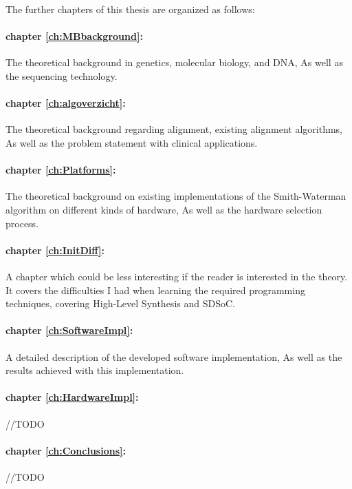 The further chapters of this thesis are organized as follows:

\paragraph{chapter \ref{ch:MBbackground}:} The theoretical background in genetics, molecular biology, and DNA, As well as the sequencing technology.
\paragraph{chapter \ref{ch:algoverzicht}:} The theoretical background regarding alignment, existing alignment algorithms, As well as the problem statement with clinical applications.
\paragraph{chapter \ref{ch:Platforms}:} The theoretical background on existing implementations of the Smith-Waterman algorithm on different kinds of hardware, As well as the hardware selection process.
\paragraph{chapter \ref{ch:InitDiff}:} A chapter which could be less interesting if the reader is interested in the theory. It covers the difficulties I had when learning the required programming techniques, covering High-Level Synthesis and SDSoC. 
\paragraph{chapter \ref{ch:SoftwareImpl}:} A detailed description of the developed software implementation, As well as the results achieved with this implementation.
\paragraph{chapter \ref{ch:HardwareImpl}:} //TODO
\paragraph{chapter \ref{ch:Conclusions}:} //TODO